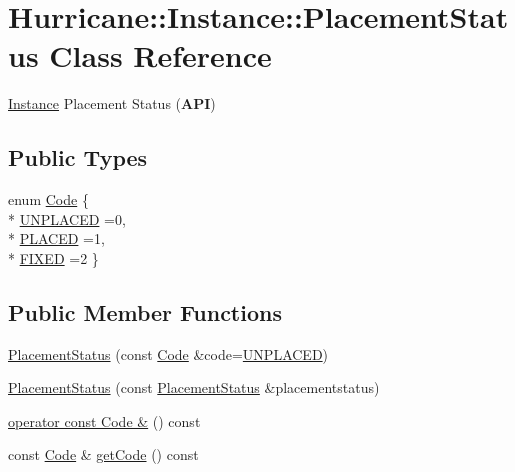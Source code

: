 \hypertarget{classHurricane_1_1Instance_1_1PlacementStatus}{\section{Hurricane\-:\-:Instance\-:\-:Placement\-Status Class Reference}
\label{classHurricane_1_1Instance_1_1PlacementStatus}
}


\hyperlink{classHurricane_1_1Instance}{Instance} Placement Status ({\bfseries A\-P\-I})  


\subsection*{Public Types}
\begin{DoxyCompactItemize}
\item 
enum \hyperlink{classHurricane_1_1Instance_1_1PlacementStatus_af76cc0838783b3eb3a515eb3c3e0f7bf}{Code} \{ \\*
\hyperlink{classHurricane_1_1Instance_1_1PlacementStatus_af76cc0838783b3eb3a515eb3c3e0f7bfa3e19a0a1b3e8c8fd860164df7f935216}{U\-N\-P\-L\-A\-C\-E\-D} =0, 
\\*
\hyperlink{classHurricane_1_1Instance_1_1PlacementStatus_af76cc0838783b3eb3a515eb3c3e0f7bfaf3589c11ecd7d5de63db24826b74d457}{P\-L\-A\-C\-E\-D} =1, 
\\*
\hyperlink{classHurricane_1_1Instance_1_1PlacementStatus_af76cc0838783b3eb3a515eb3c3e0f7bfa47be8a40f04081635fe24485ae7c6bd7}{F\-I\-X\-E\-D} =2
 \}
\end{DoxyCompactItemize}
\subsection*{Public Member Functions}
\begin{DoxyCompactItemize}
\item 
\hyperlink{classHurricane_1_1Instance_1_1PlacementStatus_a29d2678343f4b712a9bbbb8f5460ec11}{Placement\-Status} (const \hyperlink{classHurricane_1_1Instance_1_1PlacementStatus_af76cc0838783b3eb3a515eb3c3e0f7bf}{Code} \&code=\hyperlink{classHurricane_1_1Instance_1_1PlacementStatus_af76cc0838783b3eb3a515eb3c3e0f7bfa3e19a0a1b3e8c8fd860164df7f935216}{U\-N\-P\-L\-A\-C\-E\-D})
\item 
\hyperlink{classHurricane_1_1Instance_1_1PlacementStatus_a121a628ab6f7a86b99acacc0d874d97b}{Placement\-Status} (const \hyperlink{classHurricane_1_1Instance_1_1PlacementStatus}{Placement\-Status} \&placementstatus)
\item 
\hyperlink{classHurricane_1_1Instance_1_1PlacementStatus_a7bd2d33303d5a18d6b5349ae56796fd6}{operator const Code \&} () const 
\item 
const \hyperlink{classHurricane_1_1Instance_1_1PlacementStatus_af76cc0838783b3eb3a515eb3c3e0f7bf}{Code} \& \hyperlink{classHurricane_1_1Instance_1_1PlacementStatus_a815ddc01c05be1287d056b7ef98dbb69}{get\-Code} () const 
\end{DoxyCompactItemize}


